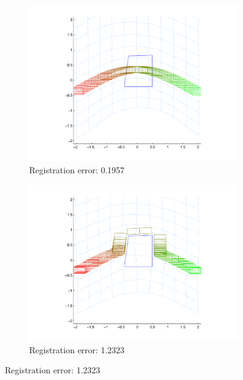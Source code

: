 \begin{figure}
\begin{subfigure}[b]{0.33\textwidth}
\includegraphics[width=\textwidth]{holonomic_warponly}
\caption{Registration error: 0.1957}
\label{subfig:holonomic_results_warponly}
\end{subfigure}
\begin{subfigure}[b]{0.33\textwidth}
\includegraphics[width=\textwidth]{holonomic_twostep}
\caption{Registration error: 1.2323}
\label{subfig:holonomic_results_twostep}
\end{subfigure}

\end{figure}
